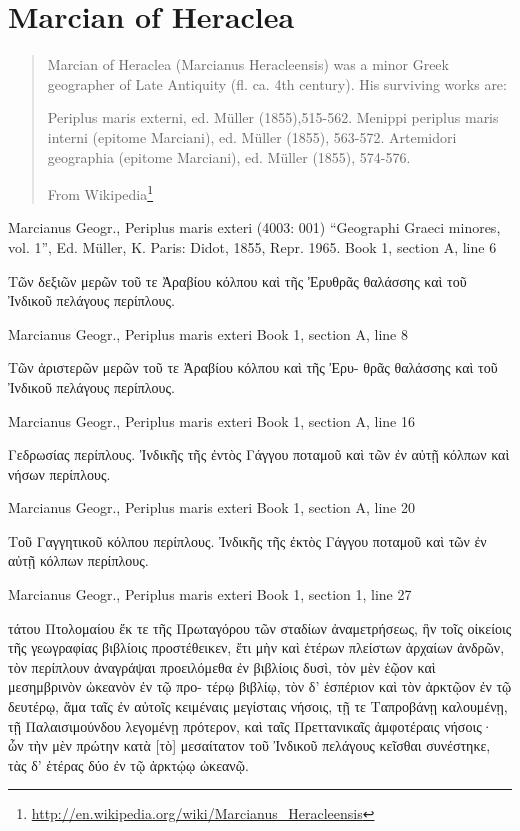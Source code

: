 \documentclass[12pt,letterpaper,twoside,final]{memoir}
\begin{document}
\section{Marcian of Heraclea}
\blockquote[From Wikipedia\footnote{\url{http://en.wikipedia.org/wiki/Marcianus_Heracleensis}}]{Marcian of Heraclea (Marcianus Heracleensis) was a minor Greek geographer of Late Antiquity (fl. ca. 4th century). His surviving works are:

    Periplus maris externi, ed. Müller (1855),515-562.
    Menippi periplus maris interni (epitome Marciani), ed. Müller (1855), 563-572.
    Artemidori geographia (epitome Marciani), ed. Müller (1855), 574-576.
}
\begin{greek}

Marcianus Geogr., Periplus maris exteri (4003: 001)
“Geographi Graeci minores, vol. 1”, Ed. Müller, K.
Paris: Didot, 1855, Repr. 1965.
Book 1, section A, line 6

Τῶν δεξιῶν μερῶν τοῦ τε Ἀραβίου κόλπου καὶ τῆς Ἐρυθρᾶς 
θαλάσσης καὶ τοῦ Ἰνδικοῦ πελάγους περίπλους. 



Marcianus Geogr., Periplus maris exteri 
Book 1, section A, line 8

Τῶν ἀριστερῶν μερῶν τοῦ τε Ἀραβίου κόλπου καὶ τῆς Ἐρυ-
θρᾶς θαλάσσης καὶ τοῦ Ἰνδικοῦ πελάγους περίπλους. 



Marcianus Geogr., Periplus maris exteri 
Book 1, section A, line 16

Γεδρωσίας περίπλους. 
 Ἰνδικῆς τῆς ἐντὸς Γάγγου ποταμοῦ καὶ τῶν ἐν αὐτῇ κόλπων 
καὶ νήσων περίπλους. 



Marcianus Geogr., Periplus maris exteri 
Book 1, section A, line 20

Τοῦ Γαγγητικοῦ κόλπου περίπλους.   
 Ἰνδικῆς τῆς ἐκτὸς Γάγγου ποταμοῦ καὶ τῶν ἐν αὐτῇ κόλπων 
περίπλους. 



Marcianus Geogr., Periplus maris exteri 
Book 1, section 1, line 27

τάτου Πτολομαίου ἔκ τε τῆς Πρωταγόρου τῶν σταδίων 
ἀναμετρήσεως, ἣν τοῖς οἰκείοις τῆς γεωγραφίας βιβλίοις 
προστέθεικεν, ἔτι μὴν καὶ ἑτέρων πλείστων ἀρχαίων 
ἀνδρῶν, τὸν περίπλουν ἀναγράψαι προειλόμεθα ἐν βιβλίοις 
δυσὶ, τὸν μὲν ἑῷον καὶ μεσημβρινὸν ὠκεανὸν ἐν τῷ προ-
τέρῳ βιβλίῳ, τὸν δ' ἑσπέριον καὶ τὸν ἀρκτῷον ἐν τῷ 
δευτέρῳ, ἅμα ταῖς ἐν αὐτοῖς κειμέναις μεγίσταις νήσοις, 
τῇ τε Ταπροβάνῃ καλουμένῃ, τῇ Παλαισιμούνδου 
λεγομένῃ πρότερον, καὶ ταῖς Πρεττανικαῖς ἀμφοτέραις   
νήσοις· ὧν τὴν μὲν πρώτην κατὰ [τὸ] μεσαίτατον τοῦ 
Ἰνδικοῦ πελάγους κεῖσθαι συνέστηκε, τὰς δ' ἑτέρας δύο 
ἐν τῷ ἀρκτῴῳ ὠκεανῷ. 




\end{greek}
\end{document}
